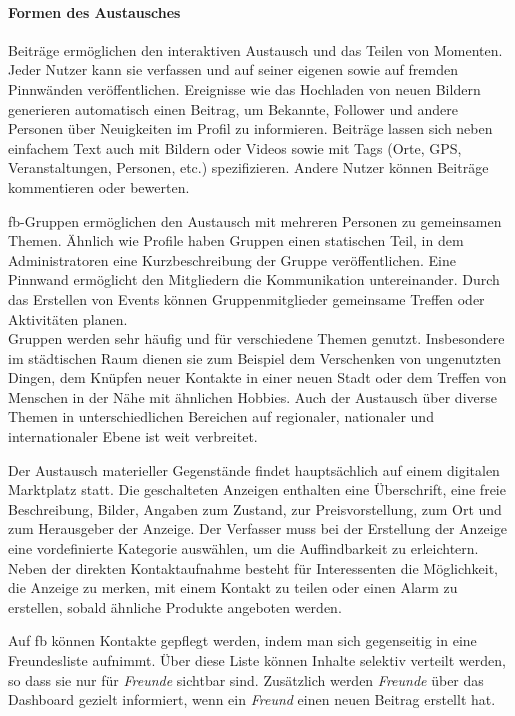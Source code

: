 \paragraph{Formen des Austausches}

Beiträge ermöglichen den interaktiven Austausch und das Teilen von Momenten. Jeder Nutzer kann sie verfassen und auf seiner eigenen sowie auf fremden Pinnwänden veröffentlichen. Ereignisse wie das Hochladen von neuen Bildern generieren automatisch einen Beitrag, um Bekannte, Follower und andere Personen über Neuigkeiten im Profil zu informieren. Beiträge lassen sich neben einfachem Text auch mit Bildern oder Videos sowie mit Tags (Orte, GPS, Veranstaltungen, Personen, etc.) spezifizieren. Andere Nutzer können Beiträge kommentieren oder bewerten.

\acrshort{fb}-Gruppen ermöglichen den Austausch mit mehreren Personen zu gemeinsamen Themen. Ähnlich wie Profile haben Gruppen einen statischen Teil, in dem Administratoren eine Kurzbeschreibung der Gruppe veröffentlichen. Eine Pinnwand ermöglicht den Mitgliedern die Kommunikation untereinander. Durch das Erstellen von Events können Gruppenmitglieder gemeinsame Treffen oder Aktivitäten planen.\\
Gruppen werden sehr häufig und für verschiedene Themen genutzt. Insbesondere im städtischen Raum dienen sie zum Beispiel dem Verschenken von ungenutzten Dingen, dem Knüpfen neuer Kontakte in einer neuen Stadt oder dem Treffen von Menschen in der Nähe mit ähnlichen Hobbies. Auch der Austausch über diverse Themen in unterschiedlichen Bereichen auf regionaler, nationaler und internationaler Ebene ist weit verbreitet.

Der Austausch materieller Gegenstände findet hauptsächlich auf einem digitalen Marktplatz statt. Die geschalteten Anzeigen enthalten eine Überschrift, eine freie Beschreibung, Bilder, Angaben zum Zustand, zur Preisvorstellung, zum Ort und zum Herausgeber der Anzeige. Der Verfasser muss bei der Erstellung der Anzeige eine vordefinierte Kategorie auswählen, um die Auffindbarkeit zu erleichtern. Neben der direkten Kontaktaufnahme besteht für Interessenten die Möglichkeit, die Anzeige zu merken, mit einem Kontakt zu teilen oder einen Alarm zu erstellen, sobald ähnliche Produkte angeboten werden.

Auf \acrshort{fb} können Kontakte gepflegt werden, indem man sich gegenseitig in eine Freundesliste aufnimmt. Über diese Liste können Inhalte selektiv verteilt werden, so dass sie nur für \textit{Freunde} sichtbar sind. Zusätzlich werden \textit{Freunde} über das Dashboard gezielt informiert, wenn ein \textit{Freund} einen neuen Beitrag erstellt hat.

